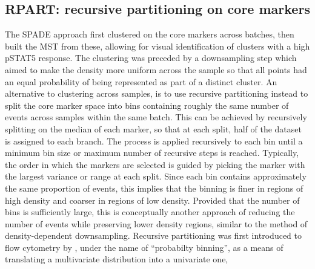 \subsection{\label{RPART} RPART: recursive partitioning on core markers} 

The \gls{SPADE} approach first clustered on the core markers across batches,
then built the \gls{MST} from these, allowing for visual identification of
clusters with a high pSTAT5 response.
The clustering was preceded by a downsampling step which aimed to make the density
more uniform across the sample so that all points had an equal probability of being
represented as part of a distinct cluster.  
An alternative to clustering across samples, is to use recursive partitioning instead to split the core marker space into bins containing roughly the same number of
events across samples within the same batch.
This can be achieved by recursively splitting on the median of each marker,
so that at each split, half of the dataset is assigned to each branch.
The process is applied recursively to each bin until a minimum bin size or maximum number of recursive steps is reached.  
Typically, the order in which the markers are selected is guided by picking the marker
with the largest variance or range at each split.
Since each bin contains approximately the same proportion of events,
this implies that the binning is finer in regions of high density and coarser in regions of low density.
Provided that the number of bins is sufficiently large, this is conceptually another approach of reducing the number of events while preserving lower density regions,%
similar to the method of density-dependent downsampling.
Recursive partitioning was first introduced to flow cytometry by \citet{Roederer:2001tz},
under the name of ``probabilty binning'', as a means of translating a multivariate distribution into a univariate one,
